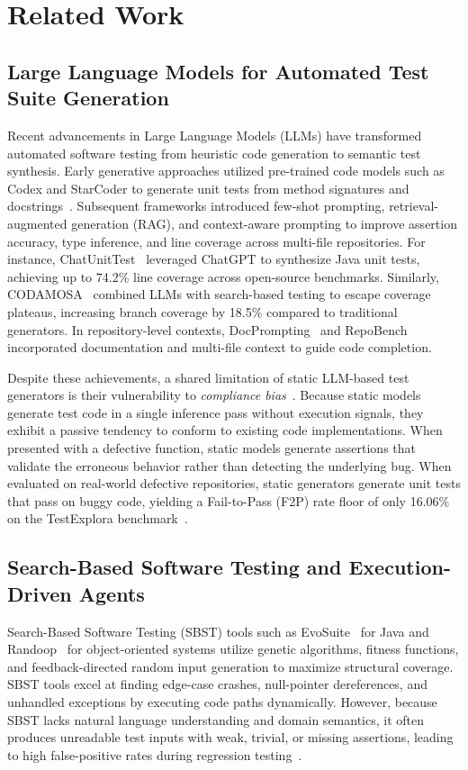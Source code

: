 \section{Related Work}
\label{sec:related}

\subsection{Large Language Models for Automated Test Suite Generation}
Recent advancements in Large Language Models (LLMs) have transformed automated software testing from heuristic code generation to semantic test synthesis. Early generative approaches utilized pre-trained code models such as Codex and StarCoder to generate unit tests from method signatures and docstrings~\cite{bareiss2022code}. Subsequent frameworks introduced few-shot prompting, retrieval-augmented generation (RAG), and context-aware prompting to improve assertion accuracy, type inference, and line coverage across multi-file repositories. For instance, ChatUnitTest~\cite{xie2023chatunitest} leveraged ChatGPT to synthesize Java unit tests, achieving up to 74.2\% line coverage across open-source benchmarks. Similarly, CODAMOSA~\cite{lemieux2023codamosa} combined LLMs with search-based testing to escape coverage plateaus, increasing branch coverage by 18.5\% compared to traditional generators. In repository-level contexts, DocPrompting~\cite{docprompting} and RepoBench~\cite{repobench} incorporated documentation and multi-file context to guide code completion.

Despite these achievements, a shared limitation of static LLM-based test generators is their vulnerability to \textit{compliance bias}~\cite{testexplora}. Because static models generate test code in a single inference pass without execution signals, they exhibit a passive tendency to conform to existing code implementations. When presented with a defective function, static models generate assertions that validate the erroneous behavior rather than detecting the underlying bug. When evaluated on real-world defective repositories, static generators generate unit tests that pass on buggy code, yielding a Fail-to-Pass (F2P) rate floor of only 16.06\% on the TestExplora benchmark~\cite{testexplora}.

\subsection{Search-Based Software Testing and Execution-Driven Agents}
Search-Based Software Testing (SBST) tools such as EvoSuite~\cite{evosuite} for Java and Randoop~\cite{randoop} for object-oriented systems utilize genetic algorithms, fitness functions, and feedback-directed random input generation to maximize structural coverage. SBST tools excel at finding edge-case crashes, null-pointer dereferences, and unhandled exceptions by executing code paths dynamically. However, because SBST lacks natural language understanding and domain semantics, it often produces unreadable test inputs with weak, trivial, or missing assertions, leading to high false-positive rates during regression testing~\cite{siddiq2023exploratory, schafer2023empirical}.

